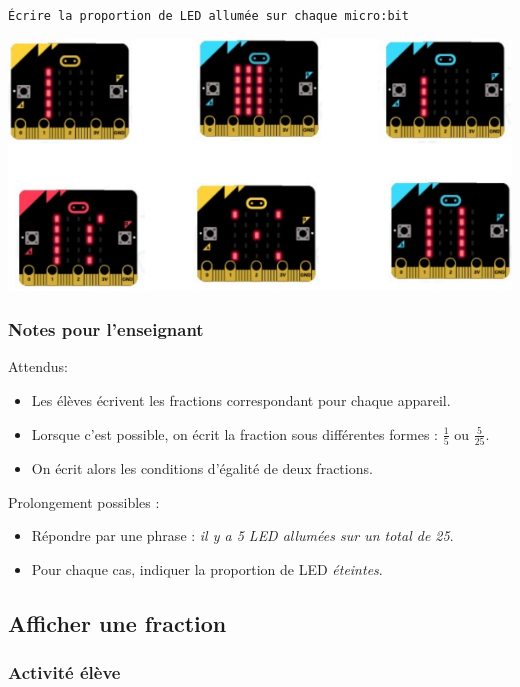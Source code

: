 \begin{eleve}    
    \texttt{Écrire la proportion de LED allumée sur chaque micro:bit}
    
    \centerline{\includegraphics[width=0.75\linewidth]{res/mb-fraction.png}}
\end{eleve}

%
%

\subsubsection{Notes pour l'enseignant}

Attendus:

\begin{itemize}
    \item Les élèves écrivent les fractions correspondant pour chaque appareil.
    \item Lorsque c’est possible, on écrit la fraction sous différentes formes : $\frac {1}{5}$ ou $\frac{5}{25}$.
    \item On écrit alors les conditions d’égalité de deux fractions.
\end{itemize}

\begin{remarque}
    Prolongement  possibles :
    \begin{itemize}
        \item Répondre par une phrase : \emph{il y a 5 LED allumées sur un total de 25}.
        \item Pour chaque cas, indiquer la proportion de LED \emph{éteintes}.
    \end{itemize}
\end{remarque}


%
%
\newpage
\subsection{Afficher une fraction}
\subsubsection{Activité élève}

